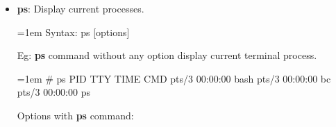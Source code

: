 \setlength{\columnsep}{3pt}
\begin{flushleft}
	\begin{itemize}
		\item \textbf{ps}: Display current processes.
		\begin{tcolorbox}[breakable,notitle,boxrule=-0pt,colback=pink,colframe=pink]
			\color{black}
			\font=1em
			Syntax: ps [options]
			\font=4pt
		\end{tcolorbox}
		Eg: \textbf{ps} command without any option display current terminal process.
		\begin{tcolorbox}[breakable,notitle,boxrule=-0pt,colback=black,colframe=black]
			\color{green}
			\font=1em
			\#  ps
			\color{white}
			\newline
			    PID TTY          TIME CMD
			 pts/3    00:00:00 bash
			 pts/3    00:00:00 bc
			 pts/3    00:00:00 ps
			\font=4pt
		\end{tcolorbox}
		
		Options with \textbf{ps} command:	
		
		
		\begin{itemize}
			

\end{itemize}
\end{itemize}
\end{flushleft}
